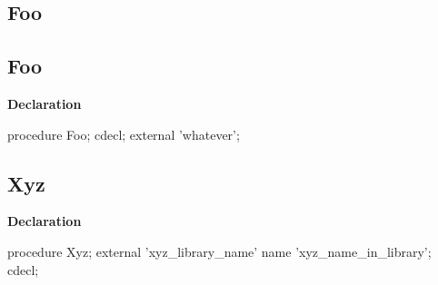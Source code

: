 \documentclass{report}
\newif\ifpdf
\begin{document}
\subsection*{\large{\textbf{Foo}}\normalsize\hspace{1ex}\hrulefill}
\else
\subsection*{Foo}
\fi
\label{ok_cdecl_external-Foo}
\begin{list}{}{
\setlength{\itemindent}{0cm}
\setlength{\listparindent}{0cm}
\setlength{\leftmargin}{\evensidemargin}
\addtolength{\leftmargin}{\tmplength}
\settowidth{\labelsep}{X}
\addtolength{\leftmargin}{\labelsep}
\setlength{\labelwidth}{\tmplength}
}
\item[\textbf{Declaration}\hfill]
\ifpdf
\begin{flushleft}
\fi
\begin{ttfamily}
procedure Foo; cdecl; external 'whatever';\end{ttfamily}

\ifpdf
\end{flushleft}
\fi

\end{list}
\ifpdf
\subsection*{\large{\textbf{Xyz}}\normalsize\hspace{1ex}\hrulefill}
\else
\subsection*{Xyz}
\fi
\label{ok_cdecl_external-Xyz}
\begin{list}{}{
\setlength{\itemindent}{0cm}
\setlength{\listparindent}{0cm}
\setlength{\leftmargin}{\evensidemargin}
\addtolength{\leftmargin}{\tmplength}
\settowidth{\labelsep}{X}
\addtolength{\leftmargin}{\labelsep}
\setlength{\labelwidth}{\tmplength}
}
\item[\textbf{Declaration}\hfill]
\ifpdf
\begin{flushleft}
\fi
\begin{ttfamily}
procedure Xyz; external 'xyz{\_}library{\_}name' name 'xyz{\_}name{\_}in{\_}library'; cdecl;\end{ttfamily}

\ifpdf
\end{flushleft}
\fi

\end{list}
\end{document}
